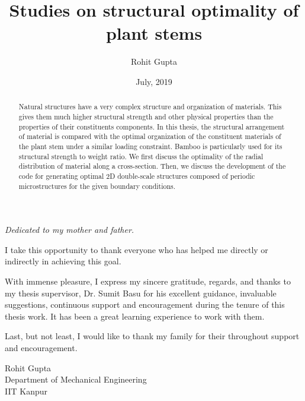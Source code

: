 \documentclass[openright,twoside]{iitkthesis}
\begin{document}

\title{Studies on structural optimality of plant stems}
\author{Rohit Gupta}
\date{July, 2019}


\thesis
{}

\maketitle

\makecertificate

\begin{dedication}
\textit{Dedicated to my mother and father.} 
\end{dedication}

\begin{abstract}
Natural structures have a very complex structure and organization of materials. This gives them much higher structural strength and other physical properties than the properties of their constituents components. In this thesis, the structural arrangement of material is compared with the optimal organization of the constituent materials of the plant stem under a similar loading constraint. Bamboo is particularly used for its structural strength to weight ratio. We first discuss the optimality of the radial distribution of material along a cross-section. Then, we discuss the development of the code for generating optimal 2D double-scale structures composed of periodic microstructures for the given boundary conditions.
\end{abstract}

\begin{acknowledgments}

I take this opportunity to thank everyone who has helped me directly or indirectly in achieving this goal. 

With immense pleasure, I express my sincere gratitude, regards, and thanks to my thesis supervisor, Dr. Sumit Basu for his excellent guidance, invaluable suggestions, continuous support and encouragement during the tenure of this thesis work. It has been a great learning experience to work with them. 

Last, but not least, I would like to thank my family for their throughout support and encouragement.
\begin{flushright}
Rohit Gupta
\\Department of Mechanical Engineering
\\IIT Kanpur
\end{flushright}

\end{acknowledgments}
\end{document}
